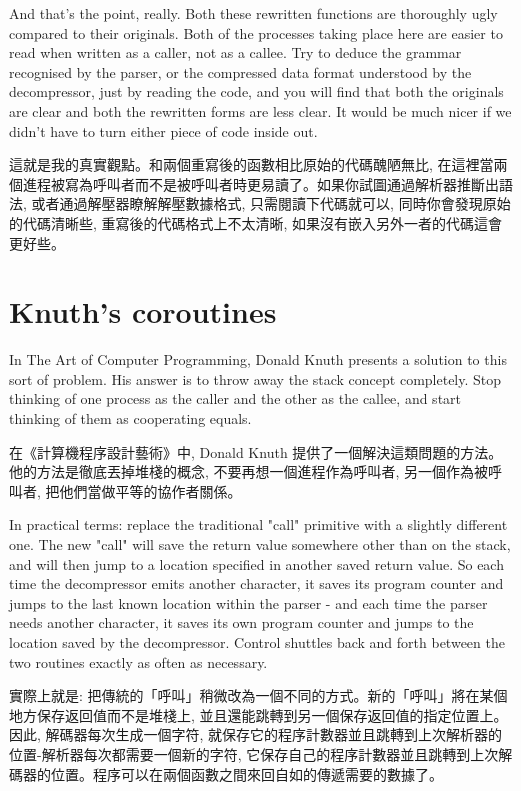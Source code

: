 \documentclass[12pt]{article}
\begin{document}
\begin{CJK}{UTF8}{bsmi}
 And that's the point, really. Both these rewritten functions are thoroughly ugly compared to their originals. Both of the processes taking place here are easier to read when written as a caller, not as a callee. Try to deduce the grammar recognised by the parser, or the compressed data format understood by the decompressor, just by reading the code, and you will find that both the originals are clear and both the rewritten forms are less clear. It would be much nicer if we didn't have to turn either piece of code inside out.


這就是我的真實觀點。和兩個重寫後的函數相比原始的代碼醜陋無比, 在這裡當兩個進程被寫為呼叫者而不是被呼叫者時更易讀了。如果你試圖通過解析器推斷出語法, 或者通過解壓器瞭解解壓數據格式, 只需閱讀下代碼就可以, 同時你會發現原始的代碼清晰些, 重寫後的代碼格式上不太清晰, 如果沒有嵌入另外一者的代碼這會更好些。 

\section{Knuth's coroutines}
 In The Art of Computer Programming, Donald Knuth presents a solution to this sort of problem. His answer is to throw away the stack concept completely. Stop thinking of one process as the caller and the other as the callee, and start thinking of them as cooperating equals.

在《計算機程序設計藝術》中, Donald Knuth 提供了一個解決這類問題的方法。他的方法是徹底丟掉堆棧的概念, 不要再想一個進程作為呼叫者, 另一個作為被呼叫者, 把他們當做平等的協作者關係。

 In practical terms: replace the traditional "call" primitive with a slightly different one. The new "call" will save the return value somewhere other than on the stack, and will then jump to a location specified in another saved return value. So each time the decompressor emits another character, it saves its program counter and jumps to the last known location within the parser - and each time the parser needs another character, it saves its own program counter and jumps to the location saved by the decompressor. Control shuttles back and forth between the two routines exactly as often as necessary.

實際上就是: 把傳統的「呼叫」稍微改為一個不同的方式。新的「呼叫」將在某個地方保存返回值而不是堆棧上, 並且還能跳轉到另一個保存返回值的指定位置上。因此, 解碼器每次生成一個字符, 就保存它的程序計數器並且跳轉到上次解析器的位置-解析器每次都需要一個新的字符, 它保存自己的程序計數器並且跳轉到上次解碼器的位置。程序可以在兩個函數之間來回自如的傳遞需要的數據了。


\end{CJK}
\end{document}
